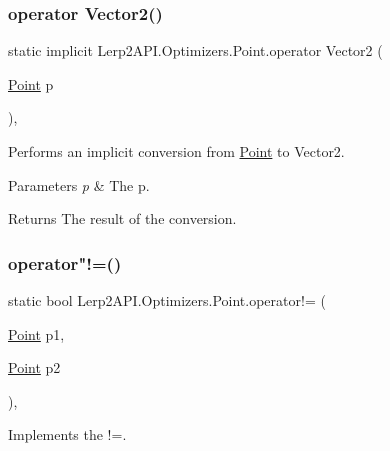 \subsubsection{\texorpdfstring{operator Vector2()}{operator Vector2()}}
{\footnotesize\ttfamily static implicit Lerp2\+A\+P\+I.\+Optimizers.\+Point.\+operator Vector2 (\begin{DoxyParamCaption}\item[{\hyperlink{struct_lerp2_a_p_i_1_1_optimizers_1_1_point}{Point}}]{p }\end{DoxyParamCaption})\hspace{0.3cm}{\ttfamily [inline]}, {\ttfamily [static]}}



Performs an implicit conversion from \hyperlink{struct_lerp2_a_p_i_1_1_optimizers_1_1_point}{Point} to Vector2. 


\begin{DoxyParams}{Parameters}
{\em p} & The p.\\
\hline
\end{DoxyParams}
\begin{DoxyReturn}{Returns}
The result of the conversion.
\end{DoxyReturn}
\mbox{\label{struct_lerp2_a_p_i_1_1_optimizers_1_1_point_a255a4310af64ddc4c2e5a6dd42cc4172}} 
\subsubsection{\texorpdfstring{operator"!=()}{operator!=()}}
{\footnotesize\ttfamily static bool Lerp2\+A\+P\+I.\+Optimizers.\+Point.\+operator!= (\begin{DoxyParamCaption}\item[{\hyperlink{struct_lerp2_a_p_i_1_1_optimizers_1_1_point}{Point}}]{p1,  }\item[{\hyperlink{struct_lerp2_a_p_i_1_1_optimizers_1_1_point}{Point}}]{p2 }\end{DoxyParamCaption})\hspace{0.3cm}{\ttfamily [inline]}, {\ttfamily [static]}}



Implements the !=. 


